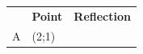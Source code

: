 {    %
    
        \begin{center}
      
      \label{m39358*id71867}
      
    \noindent
      \tablelasttail{}
      \begin{xtabular*}{\mytablewidth}[t]{|p{10\mystarwidth}|p{10\mystarwidth}|p{10\mystarwidth}|}\hline
    
    
         &
    
    
        
                    \textbf{Point}
                   &
    
    
        
                    \textbf{Reflection}
     \tabularnewline{}
    
    
        A &
    
    
        (2;1) &
    
    

\end{xtabular*}
\end{center}}
